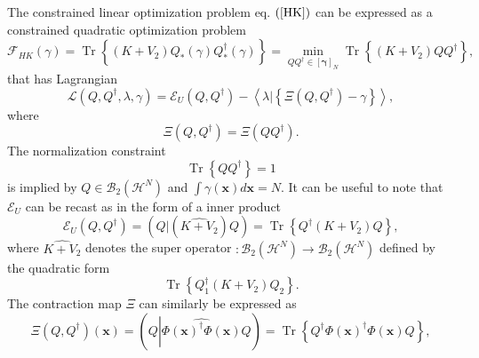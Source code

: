 \documentclass[aps,preprint]{revtex4}%
\begin{document}
The constrained linear optimization problem eq. $\left(  \ref{HK}\right)  $
can be expressed as a constrained quadratic optimization problem
\begin{equation}
\mathcal{F}_{HK}\left(  \gamma\right)  =\operatorname{Tr}\left\{
\overset{}{\left(  K+V_{2}\right)  Q_{\ast}\left(  \gamma\right)  Q_{\ast
}^{\dagger}\left(  \gamma\right)  }\right\}  =\min_{QQ^{\dagger}\in\left[
\mathbf{\gamma}\right]  _{N}}\operatorname{Tr}\left\{  \overset{}{\left(
K+V_{2}\right)  QQ^{\dagger}}\right\}  ,
\end{equation}
that has Lagrangian
\begin{equation}
\mathcal{L}\left(  Q,Q^{\dagger},\lambda,\gamma\right)  =\mathcal{E}%
_{U}\left(  Q,Q^{\dagger}\right)  -\left\langle \left.  \lambda\right\vert
\left\{  \Xi\left(  Q,Q^{\dagger}\right)  -\gamma\right\}  \right\rangle ,
\end{equation}
where
\begin{equation}
\Xi\left(  Q,Q^{\dagger}\right)  =\Xi\left(  QQ^{\dagger}\right)  .
\end{equation}
The normalization constraint
\begin{equation}
\operatorname{Tr}\left\{  QQ^{\dagger}\right\}  =1
\end{equation}
is implied by $Q\in\mathcal{B}_{2}\left(  \mathcal{H}^{N}\right)  $ and
$\int\gamma\left(  \mathbf{x}\right)  d\mathbf{x}=N.$ It can be useful to note
that $\mathcal{E}_{U}$ can be recast as in the form of a inner product
\begin{equation}
\mathcal{E}_{U}\left(  Q,Q^{\dagger}\right)  =\left(  \left.  Q\right\vert
\left(  \widehat{K+V_{2}}\right)  Q\right)  =\operatorname{Tr}\left\{
Q^{\dagger}\left(  K+V_{2}\right)  Q\right\}  ,
\end{equation}
where $\widehat{K+V_{2}}$ denotes the super operator $:\mathcal{B}_{2}\left(
\mathcal{H}^{N}\right)  \rightarrow\mathcal{B}_{2}\left(  \mathcal{H}%
^{N}\right)  $ defined by the quadratic form
\begin{equation}
\operatorname{Tr}\left\{  Q_{1}^{\dagger}\left(  K+V_{2}\right)
Q_{2}\right\}  .
\end{equation}
The contraction map $\Xi$ can similarly be expressed as
\begin{equation}
\Xi\left(  Q,Q^{\dagger}\right)  \left(  \mathbf{x}\right)  =\left(
Q\left\vert \widehat{\Phi\left(  \mathbf{x}\right)  ^{\dagger}\Phi\left(
\mathbf{x}\right)  }\right.  Q\right)  =\operatorname{Tr}\left\{  Q^{\dagger
}\Phi\left(  \mathbf{x}\right)  ^{\dagger}\Phi\left(  \mathbf{x}\right)
Q\right\}  ,
\end{equation}
\end{document}
